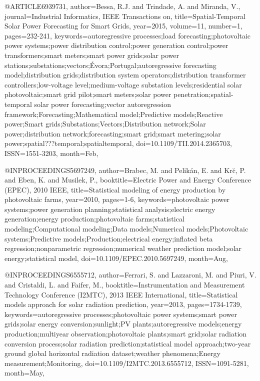 {@ARTICLE{6939731, 
author={Bessa, R.J. and Trindade, A. and Miranda, V.}, 
journal={Industrial Informatics, IEEE Transactions on}, 
title={Spatial-Temporal Solar Power Forecasting for Smart Grids}, 
year={2015}, 
volume={11}, 
number={1}, 
pages={232-241}, 
keywords={autoregressive processes;load forecasting;photovoltaic power systems;power distribution control;power generation control;power transformers;smart meters;smart power grids;solar power stations;substations;vectors;Évora;Portugal;autoregressive forecasting model;distribution grids;distribution system operators;distribution transformer controllers;low-voltage level;medium-voltage substation levels;residential solar photovoltaic;smart grid pilot;smart meters;solar power penetration;spatial-temporal solar power forecasting;vector autoregression framework;Forecasting;Mathematical model;Predictive models;Reactive power;Smart grids;Substations;Vectors;Distribution network;Solar power;distribution network;forecasting;smart grid;smart metering;solar power;spatial???temporal;spatialtemporal}, 
doi={10.1109/TII.2014.2365703}, 
ISSN={1551-3203}, 
month={Feb},}

@INPROCEEDINGS{5697249, 
author={Brabec, M. and Pelikán, E. and Krc̆, P. and Eben, K. and Musilek, P.}, 
booktitle={Electric Power and Energy Conference (EPEC), 2010 IEEE}, 
title={Statistical modeling of energy production by photovoltaic farms}, 
year={2010}, 
pages={1-6}, 
keywords={photovoltaic power systems;power generation planning;statistical analysis;electric energy generation;energy production;photovoltaic farms;statistical modeling;Computational modeling;Data models;Numerical models;Photovoltaic systems;Predictive models;Production;electrical energy;inflated beta regression;nonparametric regression;numerical weather prediction model;solar energy;statistical model}, 
doi={10.1109/EPEC.2010.5697249}, 
month={Aug},}

@INPROCEEDINGS{6555712, 
author={Ferrari, S. and Lazzaroni, M. and Piuri, V. and Cristaldi, L. and Faifer, M.}, 
booktitle={Instrumentation and Measurement Technology Conference (I2MTC), 2013 IEEE International}, 
title={Statistical models approach for solar radiation prediction}, 
year={2013}, 
pages={1734-1739}, 
keywords={autoregressive processes;photovoltaic power systems;smart power grids;solar energy conversion;sunlight;PV plants;autoregressive models;energy production;multiyear observation;photovoltaic plants;smart grid;solar radiation conversion process;solar radiation prediction;statistical model approach;two-year ground global horizontal radiation dataset;weather phenomena;Energy measurement;Monitoring}, 
doi={10.1109/I2MTC.2013.6555712}, 
ISSN={1091-5281}, 
month={May},}


}
